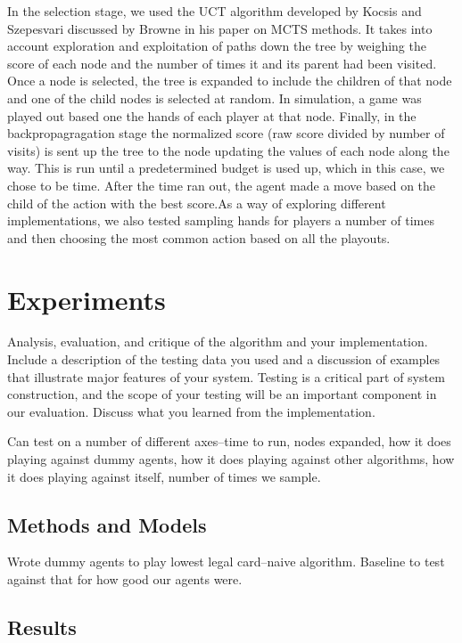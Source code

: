 \documentclass[11pt]{article}
\begin{document}
In the selection stage, we used the UCT algorithm developed by Kocsis and Szepesvari discussed by Browne in his paper on MCTS methods. It takes into account exploration and exploitation of paths down the tree by weighing the score of each node and the number of times it and its parent had been visited. Once a node is selected, the tree is expanded to include the children of that node and one of the child nodes is selected at random. In simulation, a game was played out based one the hands of each player at that node. Finally, in the backpropagragation stage the normalized score (raw score divided by number of visits) is sent up the tree to the node updating the values of each node along the way. This is run until a predetermined budget is used up, which in this case, we chose to be time. After the time ran out, the agent made a move based on the child of the action with the best score.As a way of exploring different implementations, we also tested sampling hands for players a number of times and then choosing the most common action based on all the playouts.



\section{Experiments}
Analysis, evaluation, and critique of the algorithm and your
implementation. Include a description of the testing data you used and
a discussion of examples that illustrate major features of your
system. Testing is a critical part of system construction, and the
scope of your testing will be an important component in our
evaluation. Discuss what you learned from the implementation.

Can test on a number of different axes--time to run, nodes expanded, how it does playing against dummy agents, how it does playing against other algorithms, how it does playing against itself, number of times we sample.


\subsection{Methods and Models}

Wrote dummy agents to play lowest legal card--naive algorithm. Baseline to test against that for how good our agents were.

\subsection{Results}
\end{document}
